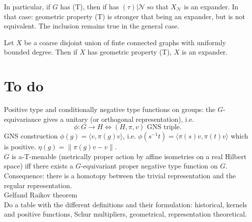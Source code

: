 In particular, if $G$ has (T), then if has $(\tau)|{\mathcal N}$ so that $X_{\mathcal N}$ is an expander. In that case: geometric property (T) is stronger that being an expander, but is not equivalent. The inclusion remains true in the general case.

\begin{thm}
Let $X$ be a coarse disjoint union of finte connected graphs with uniformly bounded degree. Then if $X$ has geometric property (T), $X$ is an expander.
\end{thm}

\section{To do}

Positive type and conditionally negative type functions on groups: the $G$-equivariance gives a unitary (or orthogonal representation), i.e.
\[\phi: G\rightarrow H \iff (H,\pi,v) \text{ GNS triple}.\] 
GNS construction $\phi(g) = \langle v,\pi(g)v\rangle$, i.e. $\phi(s^{-1}t) = \langle \pi(s)v,\pi(t)v\rangle$ which is positive. $\eta(g)= \|\pi(g)v -v\|$. \\

$G$ is a-T-menable (metrically proper action by affine isometries on a real Hilbert space) iff there exists a $G$-equivariant proper negative type function on $G$.\\

Consequence: there is a homotopy between the trivial representation and the regular representation.\\

Gelfand Raikov theorem\\

Do a table with the different definitions and their formulation: historical, kernels and positive functions, Schur multipliers, geometrical, representation theoretical.

\newpage
